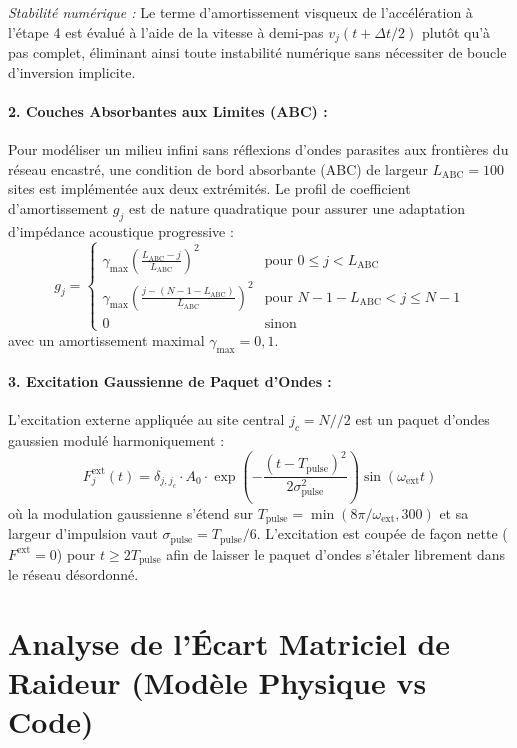 \textit{Stabilité numérique :} Le terme d'amortissement visqueux de l'accélération à l'étape 4 est évalué à l'aide de la vitesse à demi-pas $v_j(t + \Delta t/2)$ plutôt qu'à pas complet, éliminant ainsi toute instabilité numérique sans nécessiter de boucle d'inversion implicite.

\paragraph{2. Couches Absorbantes aux Limites (ABC) :}
Pour modéliser un milieu infini sans réflexions d'ondes parasites aux frontières du réseau encastré, une condition de bord absorbante (ABC) de largeur $L_{\text{ABC}} = 100$ sites est implémentée aux deux extrémités. Le profil de coefficient d'amortissement $g_j$ est de nature quadratique pour assurer une adaptation d'impédance acoustique progressive :
\begin{equation}
    g_j = \begin{cases}
        \gamma_{\max} \left( \frac{L_{\text{ABC}} - j}{L_{\text{ABC}}} \right)^2 & \text{pour } 0 \le j < L_{\text{ABC}} \\
        \gamma_{\max} \left( \frac{j - (N - 1 - L_{\text{ABC}})}{L_{\text{ABC}}} \right)^2 & \text{pour } N - 1 - L_{\text{ABC}} < j \le N-1 \\
        0 & \text{sinon}
    \end{cases}
\end{equation}
avec un amortissement maximal $\gamma_{\max} = 0{,}1$.

\paragraph{3. Excitation Gaussienne de Paquet d'Ondes :}
L'excitation externe appliquée au site central $j_c = N // 2$ est un paquet d'ondes gaussien modulé harmoniquement :
\begin{equation}
    F_j^{\text{ext}}(t) = \delta_{j, j_c} \cdot A_0 \cdot \exp\left( -\frac{(t - T_{\text{pulse}})^2}{2 \sigma_{\text{pulse}}^2} \right) \sin(\omega_{\text{ext}} t)
\end{equation}
où la modulation gaussienne s'étend sur $T_{\text{pulse}} = \min(8\pi/\omega_{\text{ext}}, 300)$ et sa largeur d'impulsion vaut $\sigma_{\text{pulse}} = T_{\text{pulse}}/6$. L'excitation est coupée de façon nette ($F^{\text{ext}} = 0$) pour $t \ge 2 T_{\text{pulse}}$ afin de laisser le paquet d'ondes s'étaler librement dans le réseau désordonné.

\section{Analyse de l'Écart Matriciel de Raideur (Modèle Physique vs Code)}


